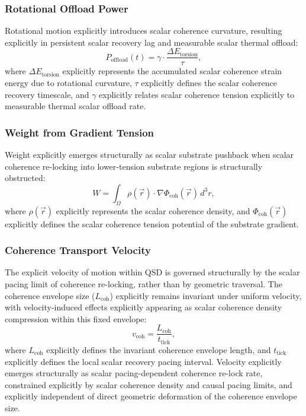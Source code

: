 \documentclass[preprints,article,submit,pdftex,moreauthors]{Definitions/mdpi}
\begin{document}
\subsubsection{Rotational Offload Power}
Rotational motion explicitly introduces scalar coherence curvature, resulting explicitly in persistent scalar recovery lag and measurable scalar thermal offload:
\begin{equation}
    P_{\text{offload}}(t) = \gamma \cdot \frac{\Delta E_{\text{torsion}}}{\tau},
\end{equation}
where \(\Delta E_{\text{torsion}}\) explicitly represents the accumulated scalar coherence strain energy due to rotational curvature, \(\tau\) explicitly defines the scalar coherence recovery timescale, and \(\gamma\) explicitly relates scalar coherence tension explicitly to measurable thermal scalar offload rate.

\subsubsection{Weight from Gradient Tension}
Weight explicitly emerges structurally as scalar substrate pushback when scalar coherence re-locking into lower-tension substrate regions is structurally obstructed:
\begin{equation}
    W = \int_{\Omega} \rho(\vec{r}) \cdot \nabla \Phi_{\text{coh}}(\vec{r}) \, d^3r,
\end{equation}
where \(\rho(\vec{r})\) explicitly represents the scalar coherence density, and \(\Phi_{\text{coh}}(\vec{r})\) explicitly defines the scalar coherence tension potential of the substrate gradient.

\subsubsection{Coherence Transport Velocity}
The explicit velocity of motion within QSD is governed structurally by the scalar pacing limit of coherence re-locking, rather than by geometric traversal. The coherence envelope size (\(L_{\text{coh}}\)) explicitly remains invariant under uniform velocity, with velocity-induced effects explicitly appearing as scalar coherence density compression within this fixed envelope:
\begin{equation}
    v_{\text{coh}} = \frac{L_{\text{coh}}}{t_{\text{tick}}},
\end{equation}
where \(L_{\text{coh}}\) explicitly defines the invariant coherence envelope length, and \(t_{\text{tick}}\) explicitly defines the local scalar recovery pacing interval. Velocity explicitly emerges structurally as scalar pacing-dependent coherence re-lock rate, constrained explicitly by scalar coherence density and causal pacing limits, and explicitly independent of direct geometric deformation of the coherence envelope size.
\end{document}
